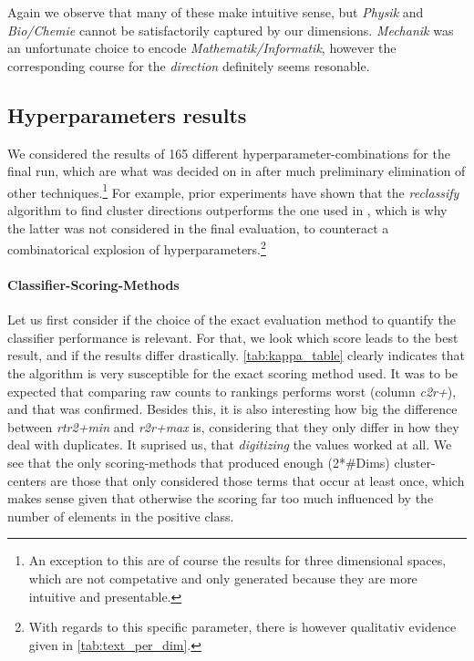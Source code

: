 Again we observe that many of these make intuitive sense, but \textit{Physik} and \textit{Bio/Chemie} cannot be satisfactorily captured by our dimensions. \textit{Mechanik} was an unfortunate choice to encode \textit{Mathematik/Informatik}, however the corresponding course for the \textit{direction} definitely seems resonable.




\subsection{Hyperparameters results}

We considered the results of 165 different hyperparameter-combinations for the final run, which are what was decided on in after much preliminary elimination of other techniques.\footnote{An exception to this are of course the results for three dimensional spaces, which are not competative and only generated because they are more intuitive and presentable.} For example, prior experiments have shown that the \textit{reclassify} algorithm to find cluster directions outperforms the one used in \cite{Derrac2015}, which is why the latter was not considered in the final evaluation, to counteract a combinatorical explosion of hyperparameters.\footnote{With regards to this specific parameter, there is however qualitativ evidence given in \autoref{tab:text_per_dim}.}

\paragraph{Classifier-Scoring-Methods}

Let us first consider if the choice of the exact evaluation method to quantify the classifier performance is relevant. For that, we look which score leads to the best result, and if the results differ drastically. \autoref{tab:kappa_table} clearly indicates that the algorithm is very susceptible for the exact scoring method used. It was to be expected that comparing raw counts to rankings performs worst (column \textit{c2r+}), and that was confirmed. Besides this, it is also interesting how big the difference between \textit{rtr2+min} and \textit{r2r+max} is, considering that they only differ in how they deal with duplicates. It suprised us, that \textit{digitizing} the values 
worked at all. We see that the only scoring-methods that produced enough (2*\#Dims) cluster-centers are those that only considered those terms that occur at least once, which makes sense given that otherwise the scoring far too much influenced by the number of elements in the positive class. 

